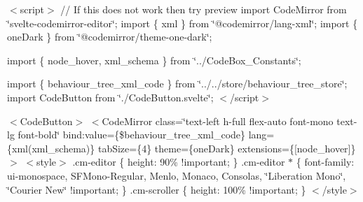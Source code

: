 $<$script$>$ // If this does not work then try preview import Code\+Mirror from \char`\"{}svelte-\/codemirror-\/editor\char`\"{}; import \{ xml \} from \char`\"{}@codemirror/lang-\/xml\char`\"{}; import \{ one\+Dark \} from \char`\"{}@codemirror/theme-\/one-\/dark\char`\"{};

import \{ node\+\_\+hover, xml\+\_\+schema \} from \char`\"{}../\+Code\+Box\+\_\+\+Constants\char`\"{};

import \{ behaviour\+\_\+tree\+\_\+xml\+\_\+code \} from \char`\"{}../../store/behaviour\+\_\+tree\+\_\+store\char`\"{}; import Code\+Button from \char`\"{}./\+Code\+Button.\+svelte\char`\"{}; $<$/script$>$

 $<$\+Code\+Button$>$ $<$\+Code\+Mirror         class=\char`\"{}text-\/left h-\/full flex-\/auto font-\/mono text-\/lg font-\/bold\char`\"{}         bind\+:value=\{\$behaviour\+\_\+tree\+\_\+xml\+\_\+code\}         lang=\{xml(xml\+\_\+schema)\}         tab\+Size=\{4\}         theme=\{one\+Dark\}         extensions=\{\mbox{[}node\+\_\+hover\mbox{]}\}     $>$ $<$style$>$ .cm-\/editor \{ height\+: 90\% !important; \} .cm-\/editor $\ast$ \{ font-\/family\+: ui-\/monospace, SFMono-\/\+Regular, Menlo, Monaco, Consolas, \char`\"{}\+Liberation Mono\char`\"{}, \char`\"{}\+Courier New\char`\"{} !important; \} .cm-\/scroller \{ height\+: 100\% !important; \} $<$/style$>$  